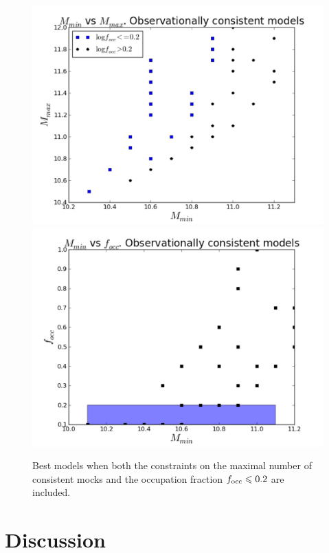 \documentclass[usenatbib]{mn2e}
\begin{document}
\begin{figure}
\begin{center}
\includegraphics[width=0.46\linewidth,angle=0]{./plots/mmin_vs_mmax.pdf}
\hspace{5mm}
\includegraphics[width=0.46\linewidth,angle=0]{./plots/mmin_vs_focc.pdf}
\end{center}
\caption{Best models when both the constraints on the maximal number
  of  consistent mocks and the occupation  fraction $f_{\rm occ}\leq
  0.2$ are included. \label{fig:restriction_mock_and_f_occ_corr}} 
\end{figure} 

\section{Discussion}



\end{document}
